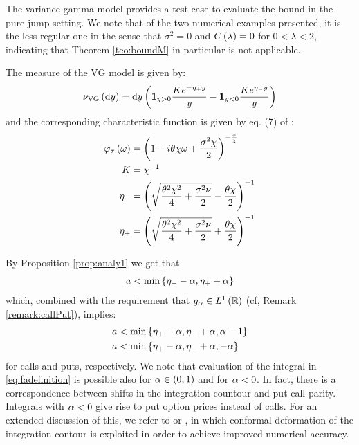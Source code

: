 \documentclass[11pt]{amsart}
\begin{document}
The variance gamma model provides a test case
to evaluate the bound in the pure-jump setting. We note
that of the two numerical examples presented, it is the less regular one
in the sense that $\sigma^2=0$ and $C \left( {\lambda} \right) = 0$ for $0 < \lambda < 2$,
indicating that Theorem \ref{teo:boundM} in particular is not applicable. 
 
The \levy measure of the VG model is given by:
\begin{align*} \label{eq:VG}
\nu_{\mathrm{VG}} \left( {\textrm{d} y} \right) 
= \textrm{d} y \left( {
\mathbf{1}_{y>0} \frac{K e^{-\eta_+ y}}{y}
- \mathbf{1}_{y<0} \frac{K e^{\eta_- y}}{y}
} \right)
\end{align*}
and the corresponding characteristic function is given by
eq. (7) of \cite{madan1998variance}:
\begin{align*}
\varphi_{\tau} \left( {{\omega}} \right) &= 
\left( {1 - i \theta \chi \omega + \frac{\sigma^2 \chi}{2}} \right)^{-\frac{\tau}{\chi}}
\\
K &= \chi^{-1}
\\
\eta_- &= \left( {\sqrt{\frac{\theta^2 \chi^2}{4}+\frac{\sigma^2 \nu}{2}} -\frac{\theta \chi}{2}} \right)^{-1}
\\
\eta_+ &= \left( {\sqrt{\frac{\theta^2 \chi^2}{4}+\frac{\sigma^2 \nu}{2}} +\frac{\theta \chi}{2}} \right)^{-1}
\end{align*}

By Proposition \ref{prop:analy1} 
we get that 
\begin{align} 
a < \mathrm{min} \left\lbrace {\eta_--\alpha,\eta_++\alpha} \right\rbrace
\end{align}
which, combined with the requirement that
$g_{\alpha} \in L^1 \left( {\mathbb{R}} \right)$ (cf, Remark \ref{remark:callPut}), implies:
\begin{align}
a &< \mathrm{min} \left\lbrace {\eta_+-\alpha,\eta_-+\alpha,\alpha-1} \right\rbrace
\\
a &< \mathrm{min} \left\lbrace {\eta_+-\alpha,\eta_-+\alpha,-\alpha} \right\rbrace
\nonumber
\end{align}
for calls and puts, respectively. We note that evaluation
of the integral in \eqref{eq:fadefinition} is possible also for $\alpha \in (0,1)$
and for $\alpha < 0$. In fact, there is a correspondence between shifts in the
integration countour and put-call parity. Integrals with $\alpha<0$ give rise to put
option prices instead of calls. For an extended discussion of this, we refer to
\cite{lee2004option} or \cite{boyarchenko2011new}, in which 
conformal deformation of the
integration contour is exploited in order to achieve improved numerical accuracy.
\end{document}
